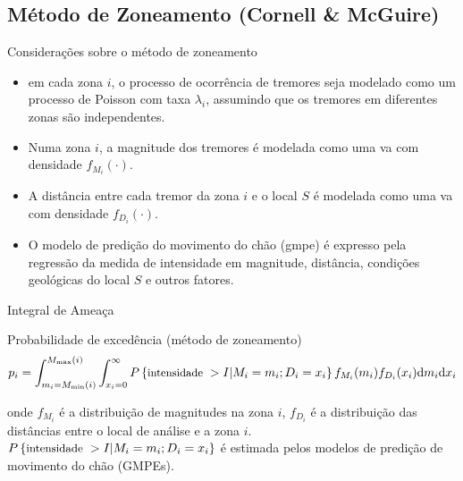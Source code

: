 \documentclass[ucs,8pt]{beamer}
\begin{document}
\subsection{Método de Zoneamento (Cornell \& McGuire)}

\begin{frame}{Considerações sobre o método de zoneamento}

	\begin{itemize}
		\item em cada zona $i$, o processo de ocorrência de tremores seja 
		modelado como um processo de Poisson com taxa $\lambda_i$, assumindo que os tremores em diferentes zonas são
		independentes.
		\item Numa zona $i$, a magnitude dos tremores é modelada como uma \gls{va}
		com densidade $f_{M_i}(\cdot)$.
		\item A distância entre cada tremor da zona $i$ e o local $S$ é modelada como uma \gls{va}
		com densidade $f_{D_i}(\cdot)$.
		\item O modelo de predição do movimento do chão (\gls{gmpe}) é expresso pela regressão da medida de intensidade
		em magnitude, distância, condições geológicas do local $S$ e outros fatores.
	\end{itemize}

\end{frame}



\begin{frame}{Integral de Ameaça}
	\begin{block}{Probabilidade de excedência (método de zoneamento)}
		\begin{equation} 
		p_i= \displaystyle \int_{m_i =M_{\min}(i)}^{M_{\max}(i)}
		\int_{x_i =0}^{\infty}  P \left\{ \mbox{\small intensidade \normalsize }>I| M_i = m_i; D_i = x_i \right\}f_{M_i}(m_i) f_{D_i}( x_i )
		\mathrm{d}m_i \mathrm{d}x_i
		\end{equation}
	\end{block}
	onde $f_{M_i}$ é a distribuição de magnitudes na zona $i$, 
	 $f_{D_i}$ é a distribuição das distâncias entre o local de análise e a zona
	 $i$. $P \left\{ \mbox{\small intensidade \normalsize }>I| M_i = m_i; D_i = x_i
	\right\}$ é estimada pelos modelos de predição de movimento do chão (GMPEs).
\end{frame}
\end{document}
